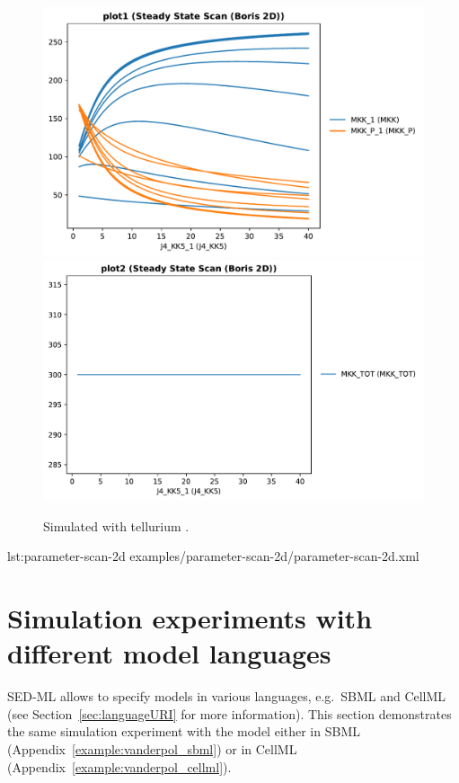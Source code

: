 \begin{figure}[ht]
\begin{minipage}{0.47\textwidth}
        \includegraphics[width=1.0\textwidth]{examples/parameter-scan-2d/results/tellurium/plot1}
		\includegraphics[width=1.0\textwidth]{examples/parameter-scan-2d/results/tellurium/plot2}
        \caption{Simulated with tellurium \citep{tellurium}.}
    \end{minipage}
    \label{fig:parameter-scan-2d}
\end{figure}

{lst:parameter-scan-2d}
{examples/parameter-scan-2d/parameter-scan-2d.xml}

\pagebreak
\section{Simulation experiments with different model languages}
SED-ML allows to specify models in various languages, e.g.\ SBML and CellML (see Section~\ref{sec:languageURI} for more information). This section demonstrates the same simulation experiment with the model either in SBML (Appendix~\ref{example:vanderpol_sbml}) or in CellML (Appendix~\ref{example:vanderpol_cellml}).

